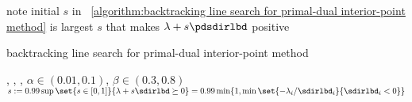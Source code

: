 \documentclass[17pt,landscape]{foils}
\newcommand\showincomplete{no}
\def\showincomplete{no}
\def\showincomplete{no}
\def\showincomplete{no}
\def\showincomplete{no}
\def\showincomplete{no}
\def\showincomplete{no}
\def\showincomplete{no}
\def\showincomplete{no}
\begin{document}
{\vitem
	note initial $s$
	in \algorithmname~\ref{algorithm:backtracking line search for primal-dual interior-point method}
	is largest $s$ that makes $\lambda + s\pdsdirlbd$ positive
\eit

\begin{myalgorithm}{backtracking line search for primal-dual interior-point method}\;%
	\begin{algorithmic}
	\Require \pdsdir, \pdsdirlbd, \pdsdirnu, $\alpha\in(0.01,0.1)$, $\beta\in(0.3,0.8)$
	\State $s:= 0.99\sup\set{s\in[0,1]}{\lambda + s \sdirlbd \succeq 0} = 0.99\min\{1,\min\set{-\lambda_i/\sdirlbd_i}{\sdirlbd_i < 0}\}$
	\EndWhile
	\EndWhile
	\end{algorithmic}
\end{myalgorithm}


\vfill

\yesnoexec{\showincomplete}{%
\myfoilhead{X}
}{}




}{}


\end{document}
